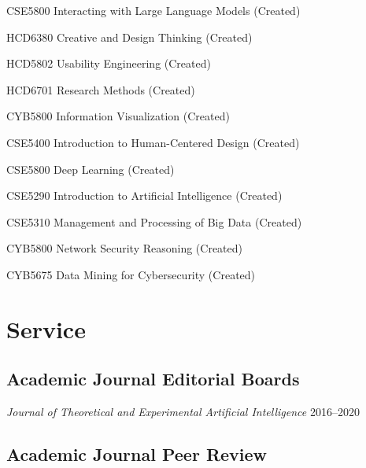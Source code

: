 \documentclass[12pt,letterpaper]{report}
\newcommand{\listitemspace}{0.25em}
\renewenvironment{itemize}
{\begin{list}{}{\setlength{\leftmargin}{0em}
                \setlength{\parskip}{0em}
                \setlength{\itemsep}{\listitemspace}
                \setlength{\parsep}{\listitemspace}}}
{\end{list}}
\begin{document}
    \begin{itemize}
        \item CSE5800 Interacting with Large Language Models (Created)
        \item HCD6380 Creative and Design Thinking (Created)
        \item HCD5802 Usability Engineering (Created)
        \item HCD6701 Research Methods (Created) 
        \item CYB5800 Information Visualization (Created)
        \item CSE5400 Introduction to Human-Centered Design (Created)
        \item CSE5800 Deep Learning (Created)
        \item CSE5290 Introduction to Artificial Intelligence (Created)
        \item CSE5310 Management and Processing of Big Data (Created)
        \item CYB5800 Network Security Reasoning (Created) 
        \item CYB5675 Data Mining for Cybersecurity (Created)
    \end{itemize}

    \section*{Service}

    \subsection*{Academic Journal Editorial Boards}

    \begin{itemize}
        \item \textit{Journal of Theoretical and Experimental Artificial Intelligence}  2016--2020
    \end{itemize}

    \subsection*{Academic Journal Peer Review}
\end{document}
